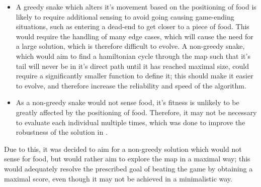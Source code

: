 \documentclass[british,10pt,a4paper]{article}
\begin{document}
\begin{itemize}
	\item A greedy snake which alters it's movement based on the positioning of food is likely to require additional sensing to avoid going causing game-ending situations, such as entering a dead-end to get closer to a piece of food. This would require the handling of many edge cases, which will cause the need for a large solution, which is therefore difficult to evolve. A non-greedy snake, which would aim to find a hamiltonian cycle through the map such that it's tail will never be in it's direct path until it has reached maximal size, could require a significantly smaller function to define it; this should make it easier to evolve, and therefore increase the reliability and speed of the algorithm.
	\item As a non-greedy snake would not sense food, it's fitness is unlikely to be greatly affected by the positioning of food. Therefore, it may not be necessary to evaluate each individual multiple times, which was done to improve the robustness of the solution in \cite{Ehlis2000-sz}.
\end{itemize}
Due to this, it was decided to aim for a non-greedy solution which would not sense for food, but would rather aim to explore the map in a maximal way; this would adequately resolve the prescribed goal of beating the game by obtaining a maximal score, even though it may not be achieved in a minimalistic way.
\end{document}
